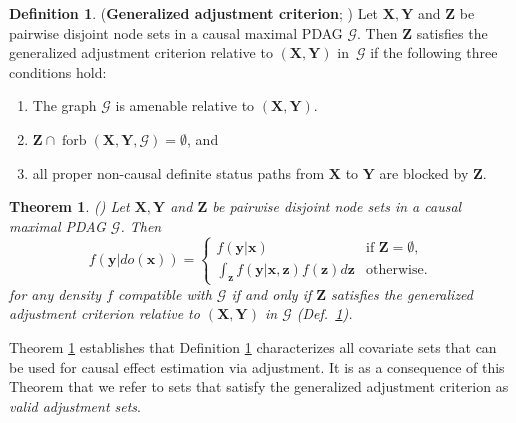 \documentclass[11pt,a4paper]{article}
\makeatletter
\newtheorem{Theorem}[Satz]{Theorem}
\theoremstyle{definition}
\newtheorem{Definition}[Satz]{Definition}
\theoremstyle{remark}
\DeclareMathOperator{\Forbb}{forb}
\newcommand{\mpdag}{maximal PDAG}
\newcommand{\g}[1][G]{\mathcal{#1}}
\newcommand{\fb}[2][X,Y]{\Forbb(\mathbf{#1},#2)}
\def\cctext#1{\expandafter\@cctext\csname c@#1\endcsname}
\def\@cctext#1{\ifcase#1\or \textbf{Amenability}\or \textbf{Forbidden set}\or \textbf{Blocking}\fi}
\makeatother
\begin{document}
\begin{figure}
 	\label{fig:exintropdag}
 \end{figure} 

 \begin{Definition}(\textbf{Generalized adjustment criterion}; \citealp[Def.\ 4.3 of][]{perkovic17})
 	\label{def: generalized adjustment criterion}
 	Let $\mathbf{X},\mathbf{Y}$ and $\mathbf{Z}$ be pairwise disjoint node sets in a causal \mpdag{} $\g$. Then $\mathbf{Z}$ satisfies the generalized adjustment criterion relative to $(\mathbf{X,Y})$ in~$\g$ if the following three conditions hold:
 	\begin{enumerate}
 		\item\label{cond0} The graph $\g$ is amenable relative to $(\mathbf{X},\mathbf{Y})$. 
 		\item\label{cond1} $\mathbf{Z} \cap \fb{\g} = \emptyset$, and
 		\item\label{cond2} all proper non-causal definite status paths from $\mathbf{X}$ to $\mathbf{Y}$ are blocked by $\mathbf{Z}$.
 	\end{enumerate}  \label{adjustment}
 \end{Definition}

\begin{Theorem} (\citealp[Theorem~4.4 in][]{perkovic17})
	Let $\mathbf{X},\mathbf{Y}$ and $\mathbf{Z}$ be pairwise disjoint node sets in a causal \mpdag{} $\g$. Then 
	\begin{equation}
	f(\mathbf{y}|do(\mathbf{x}))=
	\begin{cases}
	f(\mathbf{y}|\mathbf{x}) & \text{if }\mathbf{Z} = \emptyset,\\
	\int_{\mathbf{z}}f(\mathbf{y}|\mathbf{x,z})f(\mathbf{z})d\mathbf{z}  & \text{otherwise.}
	\end{cases}
	\label{defadjustmentmpdag}
	\end{equation}
	for any density $f$ compatible with $\g$ if and only if $\mathbf{Z}$ satisfies the generalized adjustment criterion relative to $(\mathbf{X,Y})$ in $\g$ (Def.\ \ref{def: generalized adjustment criterion}).
	\label{thm:adjustment-set}
\end{Theorem}


	Theorem \ref{thm:adjustment-set} establishes that Definition \ref{def: generalized adjustment criterion} characterizes all covariate sets that can be used for causal effect estimation via adjustment. 
	It is as a consequence of this Theorem that we refer to sets that satisfy the generalized adjustment criterion as \emph{valid adjustment sets}. 
	
\end{document}
